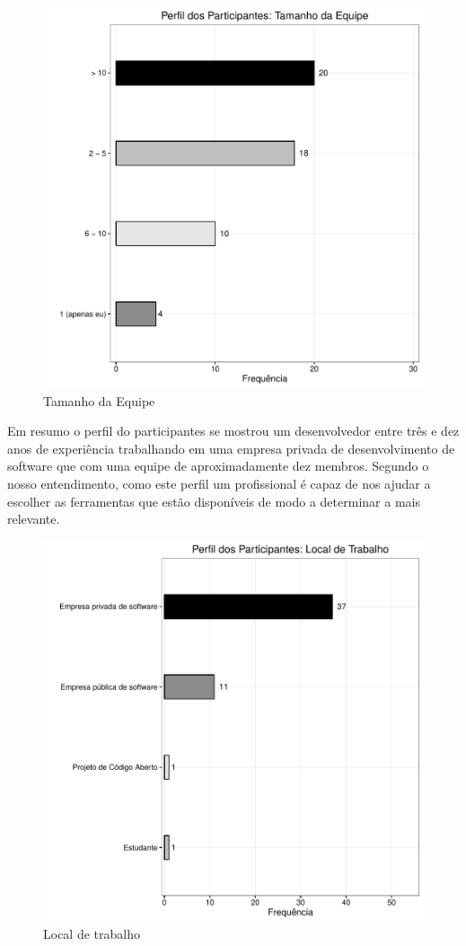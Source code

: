 \begin{figure}[htpb]
	\centering
	\includegraphics[width=0.8\linewidth]{./chapter-caracterizacao-ferramentas/img/grafico_escolha_ferramentas_tamanho_equipe.pdf}
	\caption{Tamanho da Equipe}
	\label{fig:grafico_escolha_ferramentas_tamanho_equipe}
\end{figure}

Em resumo o perfil do participantes se mostrou um desenvolvedor  entre três e
dez anos de experiência trabalhando em uma empresa privada de desenvolvimento de
software que com uma equipe de aproximadamente dez membros. Segundo o nosso
entendimento, como este perfil um profissional é capaz de nos ajudar a escolher
as ferramentas que estão disponíveis de modo a determinar a mais relevante. 

\begin{figure}[htpb]
	\centering
	\includegraphics[width=0.8\linewidth]{./chapter-caracterizacao-ferramentas/img/grafico_escolha_ferramentas_local_trabalho.pdf}
	\caption{Local de trabalho}
	\label{fig:grafico_escolha_ferramentas_local_trabalho}
\end{figure}

